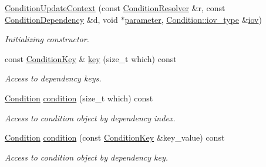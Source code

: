 \begin{DoxyCompactItemize}
\item 
\hyperlink{class_d_d4hep_1_1_conditions_1_1_condition_update_context_a259338f84924fdd338add25e7f951858}{ConditionUpdateContext} (const \hyperlink{class_d_d4hep_1_1_conditions_1_1_condition_resolver}{ConditionResolver} \&r, const \hyperlink{class_d_d4hep_1_1_conditions_1_1_condition_dependency}{ConditionDependency} \&d, void $\ast$\hyperlink{class_d_d4hep_1_1_conditions_1_1_condition_update_context_adad82de460a5c71b568e73e2f76923ba}{parameter}, \hyperlink{class_d_d4hep_1_1_i_o_v}{Condition::iov\_\-type} \&\hyperlink{class_d_d4hep_1_1_conditions_1_1_condition_update_context_acdeb1015159a6df55df3c3e614651d4e}{iov})
\begin{DoxyCompactList}\small\item\em Initializing constructor. \item\end{DoxyCompactList}\item 
const \hyperlink{class_d_d4hep_1_1_conditions_1_1_condition_key}{ConditionKey} \& \hyperlink{class_d_d4hep_1_1_conditions_1_1_condition_update_context_abfbc982283941179b03a5dcd719d3acf}{key} (size\_\-t which) const 
\begin{DoxyCompactList}\small\item\em Access to dependency keys. \item\end{DoxyCompactList}\item 
\hyperlink{class_d_d4hep_1_1_conditions_1_1_condition}{Condition} \hyperlink{class_d_d4hep_1_1_conditions_1_1_condition_update_context_ad4afd5fa0bf63e1f79329bf35034d044}{condition} (size\_\-t which) const 
\begin{DoxyCompactList}\small\item\em Access to condition object by dependency index. \item\end{DoxyCompactList}\item 
\hyperlink{class_d_d4hep_1_1_conditions_1_1_condition}{Condition} \hyperlink{class_d_d4hep_1_1_conditions_1_1_condition_update_context_a34d236304dba85a7e5542994f8274845}{condition} (const \hyperlink{class_d_d4hep_1_1_conditions_1_1_condition_key}{ConditionKey} \&key\_\-value) const 
\begin{DoxyCompactList}\small\item\em Access to condition object by dependency key. \item\end{DoxyCompactList}\item 

\end{DoxyCompactItemize}
